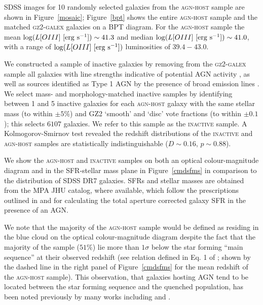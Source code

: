 \documentclass[useAMS,usenatbib]{mn2e}
\def\changed    {\color{nc} }
\def\newref    {\color{new} }
\begin{document}
SDSS images for 10 randomly selected galaxies from the \textsc{agn-host} sample are shown in Figure~\ref{mosaic}; Figure~\ref{bpt} shows the entire \textsc{agn-host} sample and the matched \textsc{gz2-galex} galaxies on a BPT diagram.  For the \textsc{agn-host} sample the mean $\log (L[OIII] ~[\rm{erg~s^{-1}}]) \sim 41.3$ and median $\log (L[OIII] ~[\rm{erg~s^{-1}}]) \sim 41.0$, with a range of $\log (L[OIII] ~[\rm{erg~s^{-1}}])$ luminosities of $39.4-43.0$. 


We constructed a sample of inactive galaxies by removing from the \textsc{gz2-galex} sample {\changed all galaxies with line strengths indicative of potential AGN activity \citep*{Kauff03b}}, as well as sources identified as Type 1 AGN by the presence of broad emission lines \citep{Oh15}. {\changed We select mass- and morphology-matched inactive samples by identifying between 1 and 5 inactive galaxies for each \textsc{agn-host} galaxy with the same stellar mass (to within $\pm5\%$) and GZ2 `smooth' and `disc' vote fractions (to within $\pm 0.1$); this selects $6107$ galaxies.} We refer to this sample as the \textsc{inactive} sample. A Kolmogorov-Smirnov test revealed the redshift distributions of the \textsc{inactive} and \textsc{agn-host} samples are statistically indistinguishable ($D \sim 0.16$, $p \sim 0.88$). 


{\newref We show the \textsc{agn-host} and \textsc{inactive}  samples on both an optical colour-magnitude diagram and in the SFR-stellar mass plane in Figure~\ref{cmdsfms} in comparison to the distribution of SDSS DR7 galaxies. SFRs and stellar masses are obtained from the MPA JHU catalog, where available, which follow the prescriptions outlined in \cite{Brinch04} and \cite{Salim07} for calculating the total aperture corrected galaxy SFR in the presence of an AGN. 

We note that the majority of the \textsc{agn-host} sample would be defined as residing in the blue cloud on the optical colour-magnitude diagram despite the fact that the majority of the sample ($51\%$) lie more than $1\sigma$ below the star forming ``main sequence'' at their observed redshift (see relation defined in Eq. 1 of \cite{Peng10}; shown by the dashed line in the right panel of Figure~\ref{cmdsfms} for the mean redshift of the \textsc{agn-host} sample). This observation, that galaxies hosting AGN tend to be located between the star forming sequence and the quenched population, has been noted previously by many works including \citet{Salim07,Sch2010, Shimzu15} and \citet{Ellison16}. }
\end{document}
